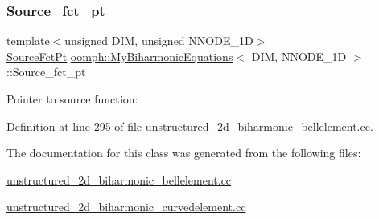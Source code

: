 \subsubsection{\texorpdfstring{Source\+\_\+fct\+\_\+pt}{Source\_fct\_pt}}
{\footnotesize\ttfamily template$<$unsigned D\+IM, unsigned N\+N\+O\+D\+E\+\_\+1D$>$ \\
\hyperlink{classoomph_1_1MyBiharmonicEquations_a17bd58054c66229016eb1c52eab36bc1}{Source\+Fct\+Pt} \hyperlink{classoomph_1_1MyBiharmonicEquations}{oomph\+::\+My\+Biharmonic\+Equations}$<$ D\+IM, N\+N\+O\+D\+E\+\_\+1D $>$\+::Source\+\_\+fct\+\_\+pt\hspace{0.3cm}{\ttfamily [protected]}}



Pointer to source function\+: 



Definition at line 295 of file unstructured\+\_\+2d\+\_\+biharmonic\+\_\+bellelement.\+cc.



The documentation for this class was generated from the following files\+:\begin{DoxyCompactItemize}
\item 
\hyperlink{unstructured__2d__biharmonic__bellelement_8cc}{unstructured\+\_\+2d\+\_\+biharmonic\+\_\+bellelement.\+cc}\item 
\hyperlink{unstructured__2d__biharmonic__curvedelement_8cc}{unstructured\+\_\+2d\+\_\+biharmonic\+\_\+curvedelement.\+cc}\end{DoxyCompactItemize}
